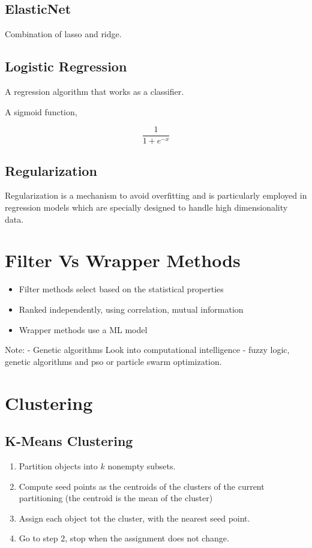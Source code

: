\documentclass[11pt]{article}
\begin{document}
\subsection{ElasticNet}
\label{sec:orgb245366}
Combination of lasso and ridge.
\subsection{Logistic Regression}
\label{sec:orge1061e6}
A regression algorithm that works as a classifier.

A sigmoid function,

$$\frac{1}{1+ e^{-x}}$$
\subsection{Regularization}
\label{sec:org1071cf1}
Regularization is a mechanism to avoid overfitting and is particularly employed in regression models which are specially designed to handle high dimensionality data.
\section{Filter Vs Wrapper Methods}
\label{sec:orgad890f7}
\begin{itemize}
\item Filter methods select based on the statistical properties
\item Ranked independently, using correlation, mutual information
\item Wrapper methods use a ML model
\end{itemize}

Note: - Genetic algorithms
Look into computational intelligence - fuzzy logic, genetic algorithms and pso or particle swarm optimization.
\section{Clustering}
\label{sec:orgd71266f}
\subsection{K-Means Clustering}
\label{sec:org80c69a6}
\begin{enumerate}
\item Partition objects into \(k\) nonempty subsets.
\item Compute seed points as the centroids of the clusters of the current partitioning (the centroid is the mean of the cluster)
\item Assign each object tot the cluster, with the nearest seed point.
\item Go to step 2, stop when the assignment does not change.
\end{enumerate}
\end{document}
